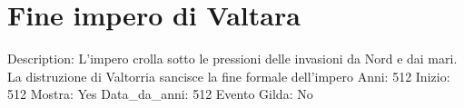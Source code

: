 \section{Fine impero di Valtara}\label{fine-impero-di-valtara}

Description: L'impero crolla sotto le pressioni delle invasioni da Nord
e dai mari. La distruzione di Valtorria sancisce la fine formale
dell'impero Anni: 512 Inizio: 512 Mostra: Yes Data\_da\_anni: 512 Evento
Gilda: No
